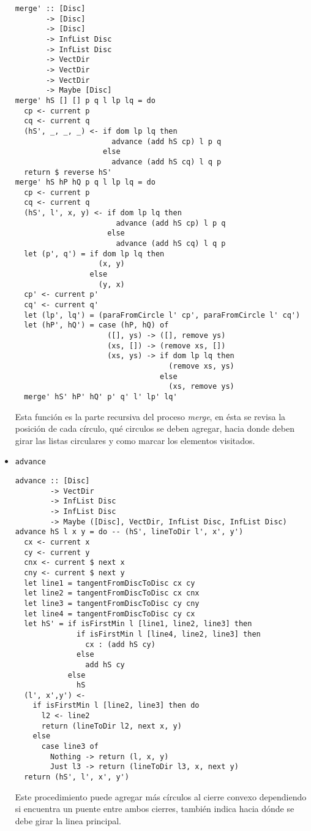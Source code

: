 \documentclass[12pt]{article}
\begin{document}
\begin{itemize}
  \begin{verbatim}
merge' :: [Disc]
       -> [Disc]
       -> [Disc]
       -> InfList Disc
       -> InfList Disc
       -> VectDir
       -> VectDir
       -> VectDir
       -> Maybe [Disc]
merge' hS [] [] p q l lp lq = do
  cp <- current p
  cq <- current q
  (hS', _, _, _) <- if dom lp lq then
                      advance (add hS cp) l p q
                    else
                      advance (add hS cq) l q p
  return $ reverse hS'
merge' hS hP hQ p q l lp lq = do
  cp <- current p
  cq <- current q
  (hS', l', x, y) <- if dom lp lq then
                       advance (add hS cp) l p q
                     else
                       advance (add hS cq) l q p
  let (p', q') = if dom lp lq then
                   (x, y)
                 else
                   (y, x)
  cp' <- current p'
  cq' <- current q'
  let (lp', lq') = (paraFromCircle l' cp', paraFromCircle l' cq')
  let (hP', hQ') = case (hP, hQ) of
                     ([], ys) -> ([], remove ys)
                     (xs, []) -> (remove xs, [])
                     (xs, ys) -> if dom lp lq then
                                   (remove xs, ys)
                                 else
                                   (xs, remove ys)
  merge' hS' hP' hQ' p' q' l' lp' lq'
  \end{verbatim}

  Esta función es la parte recursiva del proceso \textit{merge}, en ésta se revisa la posición de cada círculo, qué circulos se deben agregar, hacia donde deben girar las listas circulares y como marcar los elementos visitados.

\item \texttt{advance}

  \begin{verbatim}
advance :: [Disc]
        -> VectDir
        -> InfList Disc
        -> InfList Disc
        -> Maybe ([Disc], VectDir, InfList Disc, InfList Disc)
advance hS l x y = do -- (hS', lineToDir l', x', y')
  cx <- current x
  cy <- current y
  cnx <- current $ next x
  cny <- current $ next y
  let line1 = tangentFromDiscToDisc cx cy
  let line2 = tangentFromDiscToDisc cx cnx
  let line3 = tangentFromDiscToDisc cy cny
  let line4 = tangentFromDiscToDisc cy cx
  let hS' = if isFirstMin l [line1, line2, line3] then
              if isFirstMin l [line4, line2, line3] then
                cx : (add hS cy) 
              else
                add hS cy
            else
              hS
  (l', x',y') <-
    if isFirstMin l [line2, line3] then do
      l2 <- line2
      return (lineToDir l2, next x, y)
    else
      case line3 of
        Nothing -> return (l, x, y)
        Just l3 -> return (lineToDir l3, x, next y)
  return (hS', l', x', y')
  \end{verbatim}

  Este procedimiento puede agregar más círculos al cierre convexo dependiendo si encuentra un puente entre ambos cierres, también indica hacia dónde se debe girar la linea principal.

\end{itemize}
\end{document}
